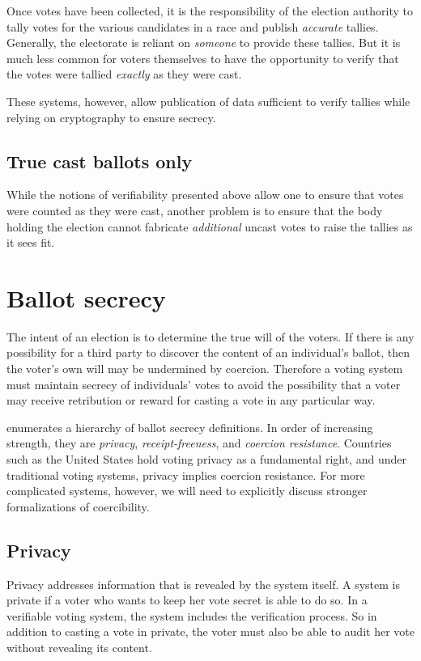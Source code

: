 \documentclass[10pt,twocolumn]{article}
\newcommand{\term}[1]{\textit{#1}}
\begin{document}
Once votes have been collected, it is the responsibility of the election authority to tally votes for the various
candidates in a race and publish \emph{accurate} tallies. Generally, the electorate is reliant on
\emph{someone} to provide these tallies. But it is much less common for voters themselves to have
the opportunity to verify that the votes were tallied \emph{exactly} as they were cast.

These systems, however, allow publication of data sufficient to verify tallies while relying on
cryptography to ensure secrecy.

\subsection{True cast ballots only}

While the notions of verifiability presented above allow one to ensure that votes were counted as
they were cast, another problem is to ensure that the body holding the election cannot fabricate
\emph{additional} uncast votes to raise the tallies as it sees fit.

\section{Ballot secrecy}

The intent of an election is to determine the true will of the voters.
If there is any possibility for a third party to discover the content of
an individual's ballot, then the voter's own will may be undermined by coercion.
Therefore a voting system must maintain secrecy of individuals' votes to avoid
the possibility that a voter may receive retribution or reward for casting a vote
in any particular way.

\cite{delaune} enumerates a hierarchy of ballot secrecy definitions.
In order of increasing strength, they are
\term{privacy}, \term{receipt-freeness}, and \term{coercion resistance}.
Countries such as the United States hold voting privacy as a fundamental right,
and under traditional voting systems, privacy implies coercion resistance.
For more complicated systems, however, we will need to explicitly discuss
stronger formalizations of coercibility.

\subsection{Privacy}

Privacy addresses information that is revealed by the system itself.
A system is private if a voter who wants to keep her vote secret is able to do so.
In a verifiable voting system, the system includes the verification process.
So in addition to casting a vote in private, the voter must also be able to
audit her vote without revealing its content.
\end{document}
